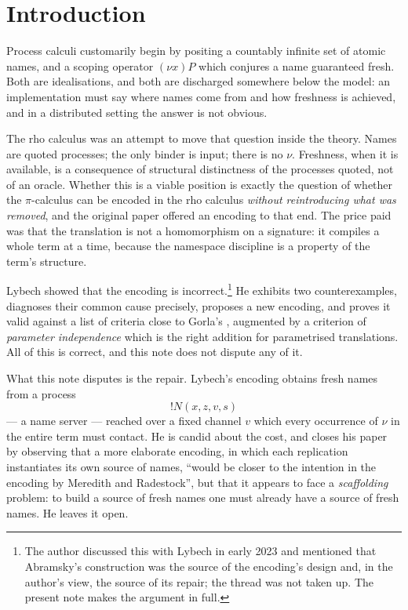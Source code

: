 \documentclass[11pt]{article}
\theoremstyle{definition}
\theoremstyle{plain}
\theoremstyle{remark}
\begin{document}
\section{Introduction}\label{sec:intro}

Process calculi customarily begin by positing a countably infinite set of
atomic names, and a scoping operator $(\nu x)P$ which conjures a name
guaranteed fresh. Both are idealisations, and both are discharged
somewhere below the model: an implementation must say where names come
from and how freshness is achieved, and in a distributed setting the
answer is not obvious.

The rho calculus \cite{MeredithRadestock05} was an attempt to move that
question inside the theory. Names are quoted processes; the only binder
is input; there is no $\nu$. Freshness, when it is available, is a
consequence of structural distinctness of the processes quoted, not of an
oracle. Whether this is a viable position is exactly the question of
whether the $\pi$-calculus can be encoded in the rho calculus
\emph{without reintroducing what was removed}, and the original paper
offered an encoding to that end. The price paid was that the translation
is not a homomorphism on a signature: it compiles a whole term at a time,
because the namespace discipline is a property of the term's structure.

Lybech \cite{Lybech22} showed that the encoding is incorrect.\footnote{%
The author discussed this with Lybech in early 2023 and mentioned that
Abramsky's construction \cite{Abramsky93} was the source of the encoding's
design and, in the author's view, the source of its repair; the thread was
not taken up. The present note makes the argument in full.}
He exhibits two counterexamples, diagnoses their common cause precisely,
proposes a new encoding, and proves it valid against a list of criteria
close to Gorla's \cite{Gorla10}, augmented by a criterion of
\emph{parameter independence} which is the right addition for
parametrised translations. All of this is correct, and this note does not
dispute any of it.

What this note disputes is the repair. Lybech's encoding obtains fresh
names from a process
\[
  !N(x,z,v,s)
\]
--- a name server --- reached over a fixed channel $v$ which every
occurrence of $\nu$ in the entire term must contact. He is candid about
the cost, and closes his paper by observing that a more elaborate
encoding, in which each replication instantiates its own source of
names, ``would be closer to the intention in the encoding by Meredith and
Radestock'', but that it appears to face a \emph{scaffolding} problem: to
build a source of fresh names one must already have a source of fresh
names. He leaves it open.
\end{document}

